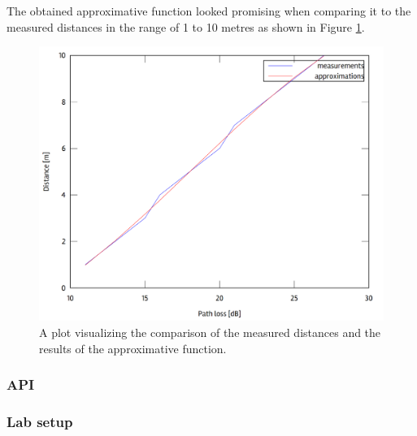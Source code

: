 			The obtained approximative function looked promising when comparing it to the measured distances in the range of 1 to 10 metres as shown in Figure \ref{fig_polyfit_plot}.

			\begin{figure}[H] 
			  \centering
			      \includegraphics[height=0.7\textwidth]{img/polyfit}
			  \caption{A plot visualizing the comparison of the measured distances and the results of the approximative function.}
			  \label{fig_polyfit_plot}
			\end{figure}
		\subsubsection{API}
		\subsubsection{Lab setup}
\clearpage